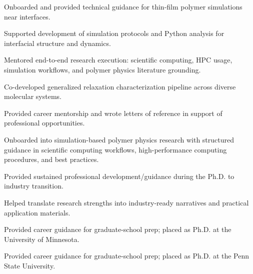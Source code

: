 \documentclass[letterpaper,11pt]{article}
\begin{document}
\begin{menteeitems}
  \item Onboarded and provided technical guidance for thin-film polymer simulations near interfaces.
  \item Supported development of simulation protocols and Python analysis for interfacial structure and dynamics.
\end{menteeitems}

\begin{menteeitems}
  \item Mentored end-to-end research execution: scientific computing, HPC usage, simulation workflows, and polymer physics literature grounding.
  \item Co-developed generalized relaxation characterization pipeline across diverse molecular systems.
  \item Provided career mentorship and wrote letters of reference in support of professional opportunities.
\end{menteeitems}

\begin{menteeitems}
  \item Onboarded into simulation-based polymer physics research with structured guidance in scientific computing workflows, high-performance computing procedures, and best practices.
\end{menteeitems}

\begin{menteeitems}
  \item Provided sustained professional development/guidance during the Ph.D. to industry transition.
  \item Helped translate research strengths into industry-ready narratives and practical application materials.
\end{menteeitems}

\begin{menteeitems}
  \item Provided career guidance for graduate-school prep; placed as Ph.D. at the University of Minnesota.
\end{menteeitems}

\begin{menteeitems}
  \item Provided career guidance for graduate-school prep; placed as Ph.D. at the Penn State University.
\end{menteeitems}
\end{document}
